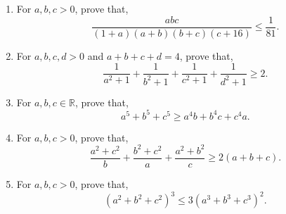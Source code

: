 \documentclass[11pt, a4paper]{article}
\begin{document}
\begin{enumerate}
	\item For $a, b, c > 0$, prove that, $$\dfrac{abc}{(1+a)(a+b)(b+c)(c+16)} \leq \dfrac{1}{81}.$$
	
	\item For $a, b, c, d > 0$ and $a+b+c+d = 4$, prove that, $$\dfrac{1}{a^2 + 1} + \dfrac{1}{b^2 + 1} + \dfrac{1}{c^2 + 1} + \dfrac{1}{d^2 + 1} \geq 2.$$
	
	\item For $a, b, c \in \mathbb{R}$, prove that, $$a^5 + b^5 + c^5 \geq a^4b + b^4c + c^4a.$$
	
	\item For $a, b, c > 0$, prove that, $$\dfrac{a^2 + c^2}{b} + \dfrac{b^2 + c^2}{a} + \dfrac{a^2 + b^2}{c} \geq 2(a+b+c).$$
	
	\item For $a, b, c > 0$, prove that, $$(a^2 + b^2 + c^2)^3 \leq 3 (a^3 + b^3 + c^3)^2.$$
\end{enumerate}
\end{document}
